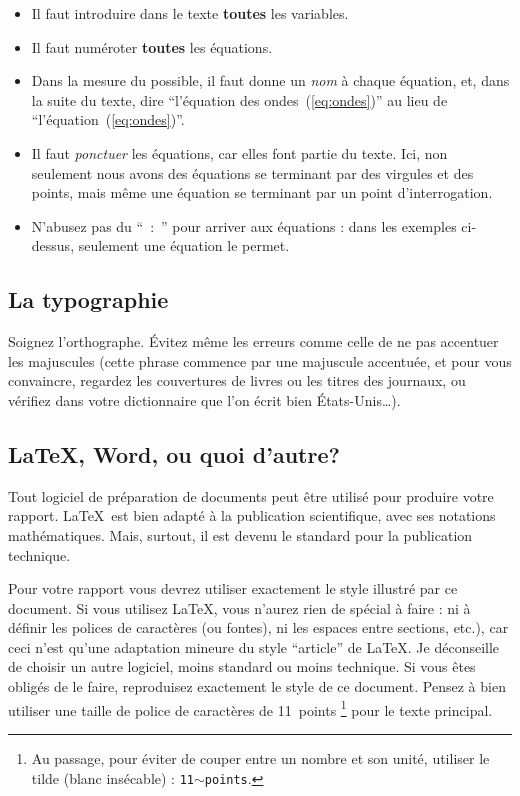 \documentclass{ipgpmaster}
\begin{document}
\begin{itemize}
     \item  Il faut introduire dans le texte {\bfseries toutes} les variables.

     \item  Il faut numéroter {\bfseries toutes} les équations.

     \item  Dans la mesure du possible, il faut donne un \emph{nom\/} à 
            chaque équation, et, dans la suite du texte, dire 
            ``l'équation des ondes~(\ref{eq:ondes})'' 
            au lieu de ``l'équation~(\ref{eq:ondes})''.

     \item  Il faut \emph{ponctuer\/} les équations, car elles font 
            partie du texte. Ici, non seulement nous avons des équations 
            se terminant par des virgules et des points, mais même 
            une équation se terminant par un point d'interrogation.

     \item  N'abusez pas du ``~:~'' pour arriver aux équations : 
            dans les exemples ci-dessus, seulement une équation le permet.
\end{itemize}

\subsection{La typographie}

Soignez l'orthographe. Évitez même les erreurs comme celle de ne pas accentuer 
les majuscules (cette phrase commence par une majuscule accentuée, et pour vous
 con\-vain\-cre, regardez les couvertures de livres ou les titres des
journaux, ou vérifiez dans votre dictionnaire que l'on écrit bien 
États-Unis\dots).

\subsection{\LaTeX, Word, ou quoi d'autre?}

Tout logiciel de préparation de documents peut être utilisé pour produire 
votre rapport. \LaTeX \ est bien adapté à la publication scientifique, 
avec ses notations ma\-thé\-ma\-ti\-ques. Mais, surtout, il est devenu le 
standard pour la publication technique.

Pour votre rapport vous devrez utiliser exactement le style illustré par ce document. 
Si vous utilisez \LaTeX, vous n'aurez rien de spécial à faire : 
ni à définir les 
 polices de caractères (ou fontes), ni les espaces entre sections, etc.), car 
ceci n'est qu'une adaptation mineure du style ``article'' de \LaTeX. 
Je déconseille de choisir un autre logiciel, moins standard ou moins technique.
Si vous \^{e}tes obligés de le faire, reproduisez exactement le style de ce 
document. Pensez à bien utiliser une taille de police de caractères de 11~points 
\footnote{Au passage, pour éviter de couper entre un nombre et son unité, 
utiliser le tilde (blanc insécable) : \texttt{11$\sim$points}.} 
pour le texte principal. 
\end{document}
